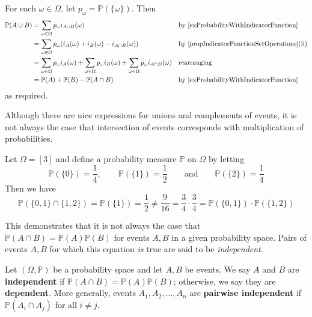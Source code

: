 \begin{cproof}
For each $\omega \in \Omega$, let $p_{\omega} = \mathbb{P}(\{\omega\})$. Then
\begin{align*}
\mathbb{P}(A \cup B) &= \sum_{\omega \in \Omega} p_{\omega}i_{A \cup B}(\omega) && \text{by \Cref{exProbabilityWithIndicatorFunction}} \\
&= \sum_{\omega \in \Omega} p_{\omega}(i_A(\omega)+i_B(\omega)-i_{A \cap B}(\omega)) && \text{by \Cref{propIndicatorFunctionSetOperations}(ii)} \\
&= \sum_{\omega \in \Omega} p_{\omega}i_A(\omega) + \sum_{\omega \in \Omega} p_{\omega}i_B(\omega) + \sum_{\omega \in \Omega} p_{\omega}i_{A \cap B}(\omega) && \text{rearranging} \\
&= \mathbb{P}(A) + \mathbb{P}(B) - \mathbb{P}(A \cap B) && \text{by \Cref{exProbabilityWithIndicatorFunction}}
\end{align*}
as required.
\end{cproof}

Although there are nice expressions for unions and complements of events, it is not always the case that intersection of events corresponds with multiplication of probabilities.

\begin{example}
Let $\Omega = [3]$ and define a probability measure $\mathbb{P}$ on $\Omega$ by letting
\[ \mathbb{P}(\{0\}) = \frac{1}{4}, \qquad \mathbb{P}(\{1\}) = \frac{1}{2} \qquad \text{and} \qquad \mathbb{P}(\{2\}) = \frac{1}{4} \]
Then we have
\[ \mathbb{P}(\{0,1\} \cap \{1,2\}) = \mathbb{P}(\{1\}) = \frac{1}{2} \ne \frac{9}{16} = \frac{3}{4} \cdot \frac{3}{4} = \mathbb{P}(\{0,1\}) \cdot \mathbb{P}(\{1,2\}) \]
\end{example}

This demonstrates that it is not always the case that $\mathbb{P}(A \cap B) = \mathbb{P}(A) \mathbb{P}(B)$ for events $A,B$ in a given probability space. Pairs of events $A,B$ for which this equation \textit{is} true are said to be \textit{independent}.

\begin{definition}
\label{defIndependentEvents}
Let $(\Omega,\mathbb{P})$ be a probability space and let $A,B$ be events. We say $A$ and $B$ are \textbf{independent} if $\mathbb{P}(A \cap B) = \mathbb{P}(A)\mathbb{P}(B)$; otherwise, we say they are \textbf{dependent}. More generally, events $A_1,A_2,\dots,A_n$ are \textbf{pairwise independent} if $\mathbb{P}(A_i \cap A_j)$ for all $i \ne j$.
\end{definition}

